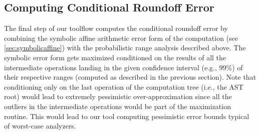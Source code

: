 %
%
%

%
%
%
%

\subsection{Computing Conditional Roundoff Error}\label{subsec:conderror}

The final step of our toolflow computes the conditional roundoff error by
combining the symbolic affine arithmetic error form of the computation (see
\cref{sec:symbolicaffine}) with the probabilistic range analysis described
above.
%
The symbolic error form gets maximized conditioned on the results of all the
intermediate operations landing in the given confidence interval (e.g., 99\%)
of their respective ranges (computed as described in the previous section).
%
%
Note that conditioning only on the last operation of the computation tree (i.e., the AST root) would lead to extremely pessimistic over-approximation since all the outliers in the intermediate operations would be part of the maximization routine.
%
This would lead to our tool \Tool computing pessimistic error bounds typical of
worst-case analyzers.
%


